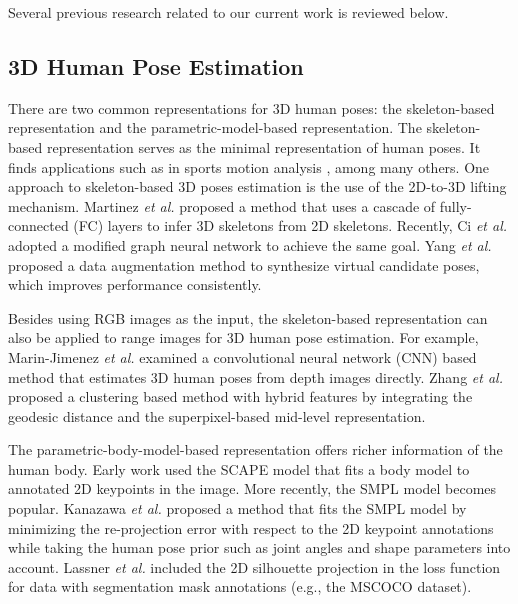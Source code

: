 \documentclass{article}
\begin{document}
Several previous research related to our current work is reviewed below.

\subsection{3D Human Pose Estimation} 

There are two common representations for 3D human poses: the
skeleton-based representation and the parametric-model-based
representation.  The skeleton-based representation serves as the minimal
representation of human poses. It finds applications such as in sports
motion analysis \cite{ohashi2020synergetic}, among many others. One
approach to skeleton-based 3D poses estimation is the use of the
2D-to-3D lifting mechanism.  Martinez {\em et al.}
\cite{martinez2017simple} proposed a method that uses a cascade of
fully-connected (FC) layers to infer 3D skeletons from 2D skeletons.
Recently, Ci {\em et al.} \cite{ci2019optimizing} adopted a modified
graph neural network to achieve the same goal. Yang {\em et al.}
\cite{yang20193d} proposed a data augmentation method to synthesize
virtual candidate poses, which improves performance consistently.

Besides using RGB images as the input, the skeleton-based representation
can also be applied to range images for 3D human pose estimation.  For
example, Marin-Jimenez {\em et al.} \cite{marin20183d} examined a
convolutional neural network (CNN) based method that estimates 3D human
poses from depth images directly.  Zhang {\em et al.} \cite{zhang20193d}
proposed a clustering based method with hybrid features by integrating
the geodesic distance and the superpixel-based mid-level representation. 

The parametric-body-model-based representation offers richer information
of the human body. Early work used the SCAPE model
\cite{anguelov2005scape} that fits a body model to annotated 2D
keypoints in the image. More recently, the SMPL model
\cite{loper2015smpl} becomes popular.  Kanazawa {\em et al.}
\cite{kanazawa2018end} proposed a method that fits the SMPL model by
minimizing the re-projection error with respect to the 2D keypoint
annotations while taking the human pose prior such as joint angles and
shape parameters into account.  Lassner {\em et al.} \cite{lassner2017unite}
included the 2D silhouette projection in the loss function for data with
segmentation mask annotations (e.g., the MSCOCO dataset).  
\end{document}
